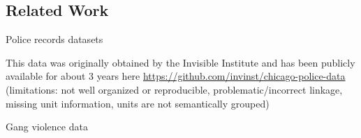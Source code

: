 \subsection{Related Work}

Police records datasets

This data was originally obtained by the Invisible Institute and has been publicly available for about 3 years here \url{https://github.com/invinst/chicago-police-data}
(limitations: not well organized or reproducible, problematic/incorrect linkage, missing unit information, units are not semantically grouped)

Gang violence data

